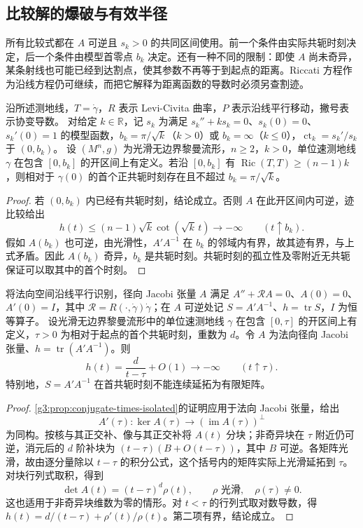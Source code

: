 \subsection{比较解的爆破与有效半径}
\label{g3:subsec:0702:04}

所有比较式都在 \(A\) 可逆且 \(s_k>0\) 的共同区间使用。前一个条件由实际共轭时刻决定，后一个条件由模型首零点 \(b_k\) 决定。还有一种不同的限制：即使 \(A\) 尚未奇异，某条射线也可能已经到达割点，使其参数不再等于到起点的距离。Riccati 方程作为沿线方程仍可继续，而把它解释为距离函数的导数时必须另查割迹。

\begin{proposition}\label{g3:prop:riccati-positive-curvature-radius}
	沿所述测地线，\(T=\dot\gamma\)，\(R\) 表示 Levi-Civita 曲率，\(P\) 表示沿线平行移动，撇号表示协变导数。
	对给定 \(k\in\mathbb R\)，记 \(s_k\) 为满足 \(s_k''+ks_k=0\)、\(s_k(0)=0\)、\(s_k'(0)=1\) 的模型函数，\(b_k=\pi/\sqrt k\)（\(k>0\)）或 \(b_k=\infty\)（\(k\le0\)），\(\operatorname{ct}_k=s_k'/s_k\) 于 \((0,b_k)\)。
	设 \((M^n,g)\) 为光滑无边界黎曼流形，\(n\ge2\)，\(k>0\)，单位速测地线 \(\gamma\) 在包含 \([0,b_k]\) 的开区间上有定义。若沿 \([0,b_k]\) 有 \(\operatorname{Ric}(T,T)\ge(n-1)k\)，则相对于 \(\gamma(0)\) 的首个正共轭时刻存在且不超过 \(b_k=\pi/\sqrt{k}\)。
\end{proposition}
\begin{proof}
	若 \((0,b_k)\) 内已经有共轭时刻，结论成立。否则 \(A\) 在此开区间内可逆，迹比较给出
	\[
		h(t)\le(n-1)\sqrt{k}\cot(\sqrt{k}\,t)
		\longrightarrow-\infty\qquad(t\uparrow b_k).
	\]
	假如 \(A(b_k)\) 也可逆，由光滑性，\(A'A^{-1}\) 在 \(b_k\) 的邻域内有界，故其迹有界，与上式矛盾。因此 \(A(b_k)\) 奇异，\(b_k\) 是共轭时刻。共轭时刻的孤立性及零附近无共轭保证可以取其中的首个时刻。
\end{proof}

\begin{proposition}\label{g3:prop:radial-riccati-blowup}
	将法向空间沿线平行识别，径向 Jacobi 张量 \(A\) 满足 \(A''+\mathcal RA=0\)、\(A(0)=0\)、\(A'(0)=I\)，其中 \(\mathcal R=R(\cdot,\dot\gamma)\dot\gamma\)；在 \(A\) 可逆处记 \(S=A'A^{-1}\)、\(h=\operatorname{tr}S\)，\(I\) 为恒等算子。
	设光滑无边界黎曼流形中的单位速测地线 \(\gamma\) 在包含 \([0,\tau]\) 的开区间上有定义，\(\tau>0\) 为相对于起点的首个共轭时刻，重数为 \(d\)。令 \(A\) 为法向径向 Jacobi 张量、\(h=\operatorname{tr}(A'A^{-1})\)。则
	\[
		h(t)=\frac{d}{t-\tau}+O(1)\longrightarrow-\infty
		\qquad(t\uparrow\tau).
	\]
	特别地，\(S=A'A^{-1}\) 在首共轭时刻不能连续延拓为有限矩阵。
\end{proposition}
\begin{proof}
	\cref{g3:prop:conjugate-times-isolated}的证明应用于法向 Jacobi 张量，给出
	\[
		A'(\tau):\ker A(\tau)\longrightarrow(\operatorname{im}A(\tau))^\perp
	\]
	为同构。按核与其正交补、像与其正交补将 \(A(t)\) 分块；非奇异块在 \(\tau\) 附近仍可逆，消元后的 \(d\) 阶补块为
	\((t-\tau)(B+O(t-\tau))\)，其中 \(B\) 可逆。各矩阵光滑，故由逐分量除以 \(t-\tau\) 的积分公式，这个括号内的矩阵实际上光滑延拓到 \(\tau\)。对块行列式取积，得到
	\[
		\det A(t)=(t-\tau)^d\rho(t),\qquad \rho\text{ 光滑},\quad\rho(\tau)\ne0.
	\]
	这也适用于非奇异块维数为零的情形。对 \(t<\tau\) 的行列式取对数导数，得
	\(h(t)=d/(t-\tau)+\rho'(t)/\rho(t)\)。第二项有界，结论成立。
\end{proof}

